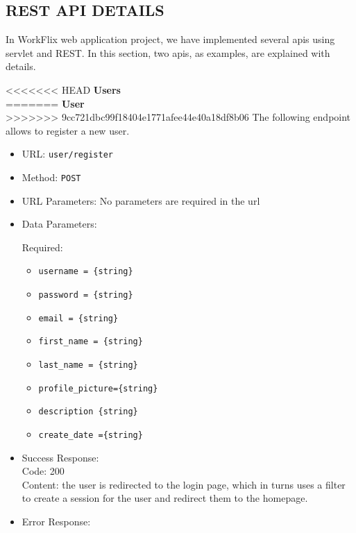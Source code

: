 \subsection{REST API DETAILS}

In WorkFlix web application project, we have implemented several apis using servlet and REST. In this section, two apis, as examples, are explained with details.


<<<<<<< HEAD
\noindent\textbf{Users}\\
=======
\noindent\textbf{User}\\
>>>>>>> 9cc721dbc99f18404e1771afee44e40a18df8b06
The following endpoint allows to register a new user.

\begin{itemize}
    \item URL: \texttt{user/register}
    \item Method: \texttt{POST}
    \item URL Parameters: No parameters are required in the url
    \item Data Parameters:
    
    Required:
    
    \begin{itemize}
        \item \texttt{username = \{string\}}
        \item \texttt{password = \{string\}}
        \item \texttt{email = \{string\}}
        \item \texttt{first\_name = \{string\}}
        \item \texttt{last\_name = \{string\}}
        \item \texttt{profile\_picture=\{string\}}
        \item \texttt{description \{string\}}
        \item \texttt{create\_date =\{string\}}
    \end{itemize}
    
    
    \item Success Response:\\
    
    Code: 200\\
    Content: the user is redirected to the login page, which in turns uses a filter to create a session for the user and redirect them to the homepage.\\

    \item Error Response:\\
    

\end{itemize}
